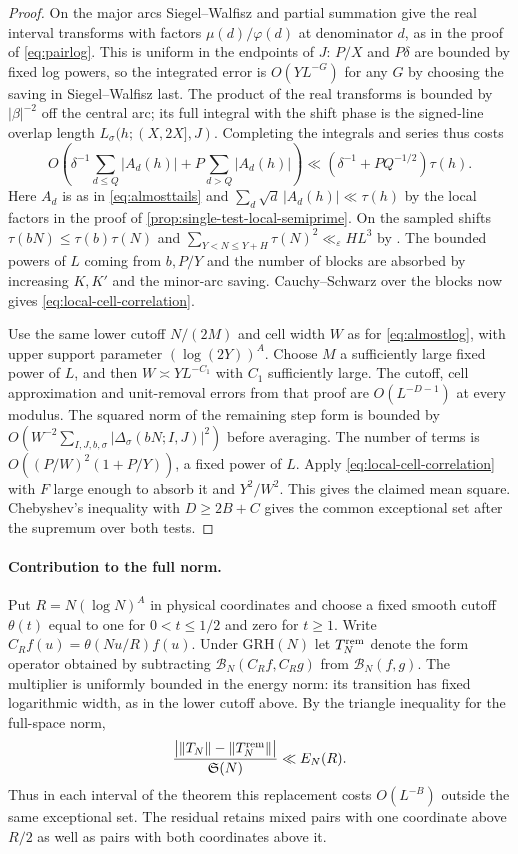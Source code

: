 \documentclass[11pt,a4paper]{article}
\numberwithin{equation}{section}
\newcommand{\SSS}{\mathfrak S}
\newcommand{\grh}{\mathrm{GRH}}
\newcommand{\B}{\mathcal B_N}
\begin{document}
\begin{proof}
On the major arcs Siegel--Walfisz and partial summation give the
real interval transforms with factors $\mu(d)/\varphi(d)$ at
denominator $d$, as in the proof of \eqref{eq:pairlog}. This is
uniform in the endpoints of $J$: $P/X$ and $P\delta$ are bounded
by fixed log powers, so the integrated error is $O(YL^{-G})$ for
any $G$ by choosing the saving in Siegel--Walfisz last.
The product of the real transforms is bounded by $|\beta|^{-2}$
off the central arc; its full integral with the shift phase is
the signed-line overlap length $L_\sigma(h;(X,2X],J)$.
Completing the integrals and series thus costs
\[
 O\left(\delta^{-1}\sum_{d\le Q}|A_d(h)|
        + P\sum_{d>Q}|A_d(h)|\right)
 \ll (\delta^{-1}+P Q^{-1/2})\tau(h).
\]
Here $A_d$ is as in \eqref{eq:almosttails} and
$\sum_d\sqrt d\,|A_d(h)|\ll\tau(h)$ by the local factors in
the proof of \cref{prop:single-test-local-semiprime}.
On the sampled shifts $\tau(bN)\le\tau(b)\tau(N)$ and
$\sum_{Y<N\le Y+H}\tau(N)^2\ll_\varepsilon H L^3$ by
\cite[Theorem~1]{ShiuShort}. The bounded powers of $L$ coming
from $b,P/Y$ and the number of blocks are absorbed by
increasing $K,K'$ and the minor-arc saving. Cauchy--Schwarz
over the blocks now gives \eqref{eq:local-cell-correlation}.

Use the same lower cutoff $N/(2M)$ and cell width $W$ as for
\eqref{eq:almostlog}, with upper support parameter $(\log(2Y))^A$.
Choose $M$ a sufficiently large fixed power of $L$, and then
$W\asymp YL^{-C_1}$ with $C_1$ sufficiently large. The cutoff,
cell approximation and unit-removal errors from that proof are
$O(L^{-D-1})$ at every modulus. The squared norm of the remaining
step form is bounded by $O(W^{-2}\sum_{I,J,b,\sigma}
|\Delta_\sigma(bN;I,J)|^2)$ before averaging. The number of
terms is $O((P/W)^2(1+P/Y))$, a fixed power of $L$.
Apply \eqref{eq:local-cell-correlation} with $F$ large enough
to absorb it and $Y^2/W^2$. This gives the claimed mean square.
Chebyshev's inequality with $D\ge 2B+C$ gives the common
exceptional set after the supremum over both tests.
\end{proof}

\paragraph{Contribution to the full norm.}
Put $R=N(\log N)^A$ in physical coordinates and choose a fixed
smooth cutoff $\theta(t)$ equal to one for $0<t\le1/2$ and
zero for $t\ge1$. Write $C_R f(u)=\theta(Nu/R)f(u)$.
Under $\grh(N)$ let $T_N^{\rm rem}$ denote the form operator
obtained by subtracting $\B(C_R f,C_R g)$ from $\B(f,g)$.
The multiplier is uniformly bounded in the energy norm:
its transition has fixed logarithmic width, as in the lower
cutoff above. By the triangle inequality for the full-space norm,
\[
 \frac{\big|\|T_N\|-\|T_N^{\rm rem}\|\big|}{\SSS(N)}
   \ll E_N(R).
\]
Thus in each interval of the theorem this replacement costs
$O(L^{-B})$ outside the same exceptional set. The residual
retains mixed pairs with one coordinate above $R/2$ as well as
pairs with both coordinates above it.
\end{document}
